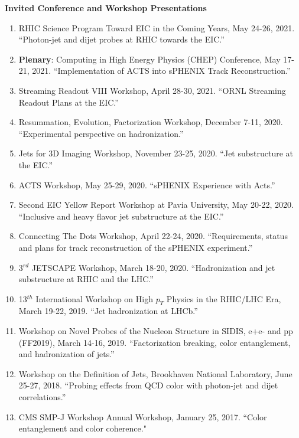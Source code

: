 \documentclass[11pt]{article}
\begin{document}
\vspace{7pt}

\begin{flushleft}
	\LARGE\textbf{Invited Conference and Workshop Presentations}
	\normalsize
	\begin{enumerate}
		\item RHIC Science Program Toward EIC in the Coming Years, May 24-26, 2021. ``Photon-jet and dijet probes at RHIC towards the EIC.''
		\item {\bf{Plenary}}: Computing in High Energy Physics (CHEP) Conference, May 17-21, 2021. ``Implementation of ACTS into sPHENIX Track Reconstruction.''
		\item Streaming Readout VIII Workshop, April 28-30, 2021. ``ORNL Streaming Readout Plans at the EIC.''\\
		\item Resummation, Evolution, Factorization Workshop, December 7-11, 2020. ``Experimental perspective on hadronization.''
		\item Jets for 3D Imaging Workshop, November 23-25, 2020. ``Jet substructure at the EIC.''
		\item ACTS Workshop, May 25-29, 2020. ``sPHENIX Experience with Acts.''
		\item Second EIC Yellow Report Workshop at Pavia University, May 20-22, 2020. ``Inclusive and heavy flavor jet substructure at the EIC.''
		\item Connecting The Dots Workshop, April 22-24, 2020. ``Requirements, status and plans for track reconstruction of the sPHENIX experiment.''
		\item 3$^{rd}$ JETSCAPE Workshop, March 18-20, 2020. ``Hadronization and jet substructure at RHIC and the LHC.''
		\item 13$^{th}$ International Workshop on High $p_T$ Physics in the RHIC/LHC Era, March 19-22, 2019. ``Jet hadronization at LHCb.''
		\item Workshop on Novel Probes of the Nucleon Structure in SIDIS, e+e- and pp (FF2019), March 14-16, 2019. ``Factorization breaking, color entanglement, and hadronization of jets.''
		\item Workshop on the Definition of Jets, Brookhaven National Laboratory, June 25-27, 2018. ``Probing effects from QCD color with photon-jet and dijet correlations.''
		\item CMS SMP-J Workshop Annual Workshop, January 25, 2017. ``Color entanglement and color coherence."
	\end{enumerate}
\end{flushleft}
\end{document}
